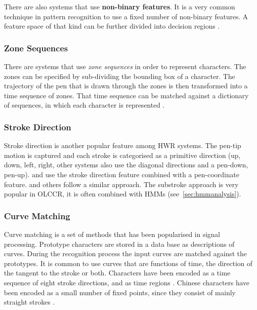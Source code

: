 There are also systems that use \textbf{non-binary features}. It is a very common
technique in pattern recognition to use a fixed number of non-binary features.
A feature space of that kind can be further divided into decision regions
.

\subsubsection{Zone Sequences}
\label{sec:zonesequences}

There are systems that use \emph{zone sequences} in order to 
represent characters. The zones can be specified by sub-dividing the bounding 
box of a character. The trajectory of the pen that is drawn through the zones
is then transformed into a time sequence of zones. That time sequence can be 
matched against a dictionary of sequences, in which each character is 
represented .

\subsubsection{Stroke Direction}
\label{sec:strokedirection}
Stroke direction is another popular feature among HWR systems. The pen-tip motion
is captured and each stroke is categorised as a primitive direction (up, down, 
left, right, other systems also use the diagonal directions and a pen-down, 
pen-up).  and  use the stroke 
direction feature combined with a pen-coordinate feature. 
 and others follow a similar approach. The substroke 
approach is very popular in OLCCR, it is often combined with HMMs 
(see~\ref{sec:hmmanalysis}).

\subsubsection{Curve Matching}
\label{sec:curvematching}

Curve matching is a set of methods that has been popularised in signal 
processing. Prototype characters are stored in a data base as descriptions 
of curves. During the recognition process the input curves are matched against 
the prototypes. It is common to use curves that are functions of time, 
the direction of the tangent to the stroke or both. Characters have been encoded as a time sequence of eight stroke directions, and as time 
regions . Chinese characters have been encoded as a 
small number of fixed points, since they consist of mainly straight strokes 
.

